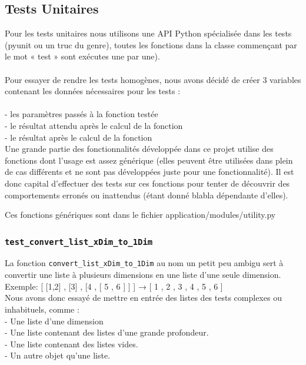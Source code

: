 \documentclass[16pts]{report}
\begin{document}
\subsection{Tests Unitaires}

Pour les tests unitaires nous utilisons une API Python spécialisée dans les 
tests (pyunit ou un truc du genre), toutes les fonctions dans la classe 
commençant par le mot « test » sont exécutes une par une).\\
\\
Pour essayer de rendre les tests homogènes, nous avons décidé de créer 3 
variables contenant les données nécessaires pour les tests :\\
\\
- les paramètres passés à la fonction testée\\
- le résultat attendu après le calcul de la fonction\\
- le résultat après le calcul de la fonction\\

Une grande partie des fonctionnalités développée dans ce projet utilise 
des fonctions dont l'usage est assez générique (elles peuvent être utilisées
dans plein de cas différents et ne sont pas développées juste pour une 
fonctionnalité). Il est donc capital d'effectuer des tests sur ces fonctions
pour tenter de découvrir des comportements erronés ou inattendus 
(étant donné blabla dépendante d'elles).

Ces fonctions génériques sont dans le fichier application/modules/utility.py

\subsubsection{\texttt{test\_convert\_list\_xDim\_to\_1Dim}}

La fonction \verb|convert_list_xDim_to_1Dim| au nom un petit peu ambigu sert à 
convertir une liste à plusieurs dimensions en une liste d'une seule dimension.
\\
Exemple: [ [1,2] , [3] , [4 , [ 5 , 6 ] ] ] → [ 1 , 2 , 3 , 4 , 5 , 6 ]\\

Nous avons donc essayé de mettre en entrée des listes des tests complexes ou 
inhabituels, comme : \\

- Une liste d’une dimension \\
- Une liste contenant des listes d'une grande profondeur. \\
- Une liste contenant des listes vides. \\
- Un autre objet qu'une liste. \\
\end{document}

